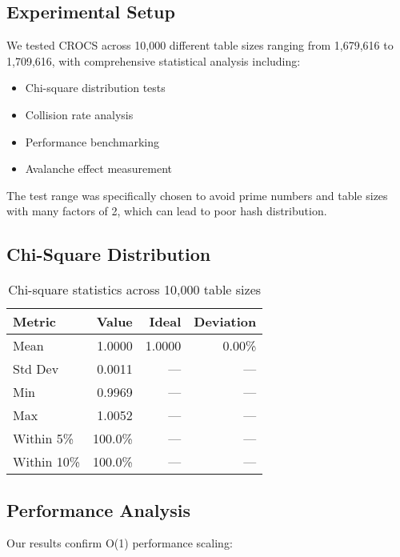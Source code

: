 \documentclass[11pt,a4paper]{article}
\theoremstyle{definition}
\newcommand{\crocs}{\textsc{CROCS}}
\begin{document}
\subsection{Experimental Setup}

We tested \crocs{} across 10,000 different table sizes ranging from 1,679,616 to 1,709,616, with comprehensive statistical analysis including:
\begin{itemize}
\item Chi-square distribution tests
\item Collision rate analysis
\item Performance benchmarking
\item Avalanche effect measurement
\end{itemize}

The test range was specifically chosen to avoid prime numbers and table sizes with many factors of 2, which can lead to poor hash distribution.

\subsection{Chi-Square Distribution}

\begin{table}[h]
\centering
\caption{Chi-square statistics across 10,000 table sizes}
\begin{tabular}{@{}lrrr@{}}
\toprule
Metric & Value & Ideal & Deviation \\
\midrule
Mean & 1.0000 & 1.0000 & 0.00\% \\
Std Dev & 0.0011 & — & — \\
Min & 0.9969 & — & — \\
Max & 1.0052 & — & — \\
Within 5\% & 100.0\% & — & — \\
Within 10\% & 100.0\% & — & — \\
\bottomrule
\end{tabular}
\end{table}

\subsection{Performance Analysis}

Our results confirm O(1) performance scaling:

\end{document}
